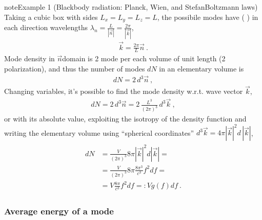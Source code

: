 \documentclass[letterpaper,10pt,english]{jupyterBook}
\begin{document}
\begin{sphinxadmonition}{note}{Example 1 (Black\sphinxhyphen{}body radiation: Planck, Wien, and Stefan\sphinxhyphen{}Boltzmann laws)}
\sphinxAtStartPar
Taking a cubic box with sides \(L_x = L_y = L_z = L\), the possibile modes have ( ) in each direction wave\sphinxhyphen{}lengths \(\lambda_n = \frac{L}{|\vec{n}|} = \frac{2 \pi}{|\vec{k}|}\),
\begin{equation*}
\begin{split}\vec{k} = \frac{2 \pi}{L} \vec{n} \ .\end{split}
\end{equation*}
\sphinxAtStartPar
Mode density in \(\vec{n}\)\sphinxhyphen{}domain is 2 mode per each volume of unit length (2 polarization), and thus the number of modes \(d N\) in an elementary volume is
\begin{equation*}
\begin{split}d N = 2 \, d^3 \vec{n} \ ,\end{split}
\end{equation*}
\sphinxAtStartPar
Changing variables, it’s possible to find the mode density w.r.t. wave vector \(\vec{k}\),
\begin{equation*}
\begin{split}d N = 2 \, d^3 \vec{n} = 2 \, \frac{L^3}{(2 \pi)^3} \, d^3 \vec{k} \ ,\end{split}
\end{equation*}
\sphinxAtStartPar
or with its absolute value, exploiting the isotropy of the density function \sphinxhyphen{} and writing the elementary volume using “spherical coordinates” \(d^3 \vec{k} = 4 \pi \left| \vec{k} \right|^2 d \, \left| \vec{k} \right|\),
\begin{equation*}
\begin{split}\begin{aligned}
  d N
  & = \frac{V}{(2 \pi)^3} 8 \pi \left| \vec{k} \right|^2 d \left| \vec{k} \right| = \\
  & = \frac{V}{(2 \pi)^3} 8 \pi \frac{8 \pi^3}{c^3} f^2 d f = \\
  & = V \frac{8 \pi}{c^3} f^2 df =: V g(f) df \ .
\end{aligned}\end{split}
\end{equation*}\subsubsection*{Average energy of a mode}


\end{sphinxadmonition}
\end{document}
